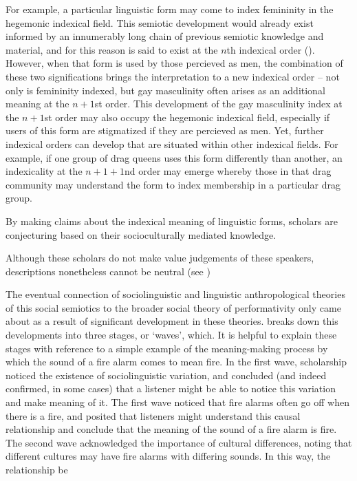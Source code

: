 For example, a particular linguistic form may come to index femininity in the hegemonic indexical field. This semiotic development would already exist informed by an innumerably long chain of previous semiotic knowledge and material, and for this reason is said to exist at the $n$th indexical order (\cite{silverstein_indexical_2003}). However, when that form is used by those percieved as men, the combination of these two significations brings the interpretation to a new indexical order -- not only is femininity indexed, but gay masculinity often arises as an additional meaning at the $n + 1$st order. This development of the gay masculinity index at the $n + 1$st order may also occupy the hegemonic indexical field, especially if users of this form are stigmatized if they are percieved as men. Yet, further indexical orders can develop that are situated within other indexical fields. For example, if one group of drag queens uses this form differently than another, an indexicality at the $n + 1 + 1$nd order may emerge whereby those in that drag community may understand the form to index membership in a particular drag group.
	 
	 
	 


	 
	 \textcite{calder_whose_2021}
	    


By making claims about the indexical meaning of linguistic forms, scholars are conjecturing based on their socioculturally mediated knowledge. 
	
	
	Although these scholars do not make value judgements of these speakers, descriptions nonetheless cannot be neutral (see \cite{zimman_beyond_2021})
	

	
	
	The eventual connection of sociolinguistic and linguistic anthropological theories of this social semiotics  to the broader social theory of performativity only came about as a result of significant development in these theories. \textcite{eckert_three_2012} breaks down this developments into three stages, or `waves', which. It is helpful to explain these stages with reference to a simple example of the meaning-making process by which the sound of a fire alarm comes to mean fire. In the first wave, scholarship noticed the existence of sociolinguistic variation, and concluded (and indeed confirmed, in some cases) that a listener might be able to notice this variation and make meaning of it. The first wave noticed that fire alarms often go off when there is a fire, and posited that listeners might understand this causal relationship and conclude that the meaning of the sound of a fire alarm is fire. The second wave acknowledged the importance of cultural differences, noting that different cultures may have fire alarms with differing sounds. In this way, the relationship be
	
